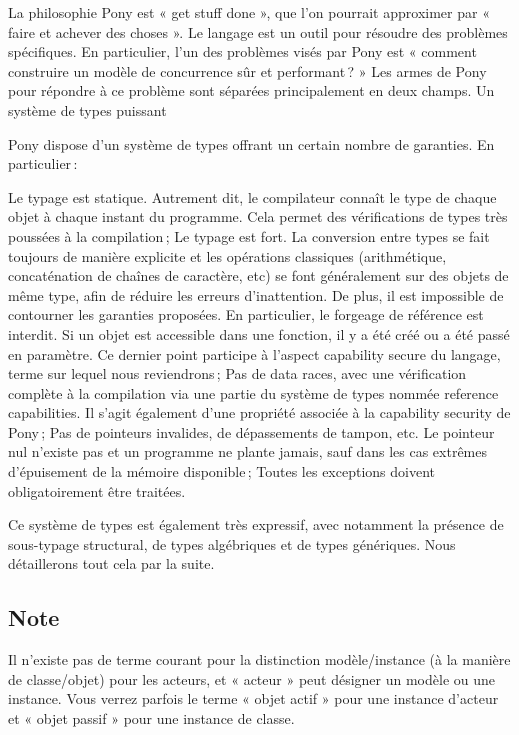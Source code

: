 \documentclass[11pt, oneside]{article}   	%
\begin{document}
La philosophie Pony est « get stuff done », que l’on pourrait approximer par « faire et achever des choses ». Le langage est un outil pour résoudre des problèmes spécifiques. En particulier, l’un des problèmes visés par Pony est « comment construire un modèle de concurrence sûr et performant ? » Les armes de Pony pour répondre à ce problème sont séparées principalement en deux champs.
Un système de types puissant

Pony dispose d’un système de types offrant un certain nombre de garanties. En particulier :

    Le typage est statique. Autrement dit, le compilateur connaît le type de chaque objet à chaque instant du programme. Cela permet des vérifications de types très poussées à la compilation ;
    Le typage est fort. La conversion entre types se fait toujours de manière explicite et les opérations classiques (arithmétique, concaténation de chaînes de caractère, etc) se font généralement sur des objets de même type, afin de réduire les erreurs d’inattention. De plus, il est impossible de contourner les garanties proposées. En particulier, le forgeage de référence est interdit. Si un objet est accessible dans une fonction, il y a été créé ou a été passé en paramètre. Ce dernier point participe à l’aspect capability secure du langage, terme sur lequel nous reviendrons ;
    Pas de data races, avec une vérification complète à la compilation via une partie du système de types nommée reference capabilities. Il s’agit également d’une propriété associée à la capability security de Pony ;
    Pas de pointeurs invalides, de dépassements de tampon, etc. Le pointeur nul n’existe pas et un programme ne plante jamais, sauf dans les cas extrêmes d’épuisement de la mémoire disponible ;
    Toutes les exceptions doivent obligatoirement être traitées.

Ce système de types est également très expressif, avec notamment la présence de sous-typage structural, de types algébriques et de types génériques. Nous détaillerons tout cela par la suite.

\subsection{Note}

Il n’existe pas de terme courant pour la distinction modèle/instance (à la manière de classe/objet) pour les acteurs, et « acteur » peut désigner un modèle ou une instance. Vous verrez parfois le terme « objet actif » pour une instance d’acteur et « objet passif » pour une instance de classe.
\end{document}
